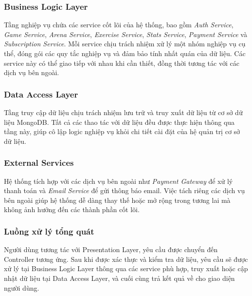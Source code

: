 \subsubsection{Business Logic Layer}
Tầng nghiệp vụ chứa các service cốt lõi của hệ thống, bao gồm \textit{Auth Service}, \textit{Game Service}, \textit{Arena Service}, \textit{Exercise Service}, \textit{Stats Service}, \textit{Payment Service} và \textit{Subscription Service}.  
Mỗi service chịu trách nhiệm xử lý một nhóm nghiệp vụ cụ thể, đóng gói các quy tắc nghiệp vụ và đảm bảo tính nhất quán của dữ liệu.  
Các service này có thể giao tiếp với nhau khi cần thiết, đồng thời tương tác với các dịch vụ bên ngoài.

\subsubsection{Data Access Layer}
Tầng truy cập dữ liệu chịu trách nhiệm lưu trữ và truy xuất dữ liệu từ cơ sở dữ liệu MongoDB.  
Tất cả các thao tác với dữ liệu đều được thực hiện thông qua tầng này, giúp cô lập logic nghiệp vụ khỏi chi tiết cài đặt của hệ quản trị cơ sở dữ liệu.

\subsubsection{External Services}
Hệ thống tích hợp với các dịch vụ bên ngoài như \textit{Payment Gateway} để xử lý thanh toán và \textit{Email Service} để gửi thông báo email.  
Việc tách riêng các dịch vụ bên ngoài giúp hệ thống dễ dàng thay thế hoặc mở rộng trong tương lai mà không ảnh hưởng đến các thành phần cốt lõi.

\subsubsection{Luồng xử lý tổng quát}
Người dùng tương tác với Presentation Layer, yêu cầu được chuyển đến Controller tương ứng.  
Sau khi được xác thực và kiểm tra dữ liệu, yêu cầu sẽ được xử lý tại Business Logic Layer thông qua các service phù hợp, truy xuất hoặc cập nhật dữ liệu tại Data Access Layer, và cuối cùng trả kết quả về cho giao diện người dùng.
